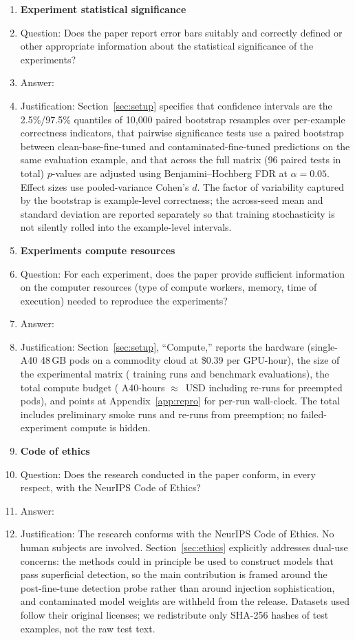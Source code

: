 \begin{enumerate}
\item {\bf Experiment statistical significance}
    \item[] Question: Does the paper report error bars suitably and correctly defined or other appropriate information about the statistical significance of the experiments?
    \item[] Answer: \answerYes{}
    \item[] Justification: Section~\ref{sec:setup} specifies that confidence intervals are the 2.5\%/97.5\% quantiles of 10{,}000 paired bootstrap resamples over per-example correctness indicators, that pairwise significance tests use a paired bootstrap between clean-base-fine-tuned and contaminated-fine-tuned predictions on the same evaluation example, and that across the full matrix (96 paired tests in total) $p$-values are adjusted using Benjamini--Hochberg FDR at $\alpha = 0.05$. Effect sizes use pooled-variance Cohen's $d$. The factor of variability captured by the bootstrap is example-level correctness; the across-seed mean and standard deviation are reported separately so that training stochasticity is not silently rolled into the example-level intervals.

\item {\bf Experiments compute resources}
    \item[] Question: For each experiment, does the paper provide sufficient information on the computer resources (type of compute workers, memory, time of execution) needed to reproduce the experiments?
    \item[] Answer: \answerYes{}
    \item[] Justification: Section~\ref{sec:setup}, ``Compute,'' reports the hardware (single-A40 48\,GB pods on a commodity cloud at \$0.39 per GPU-hour), the size of the experimental matrix ( training runs and  benchmark evaluations), the total compute budget ( A40-hours $\approx$ \,USD including re-runs for preempted pods), and points at Appendix~\ref{app:repro} for per-run wall-clock. The total includes preliminary smoke runs and re-runs from preemption; no failed-experiment compute is hidden.

\item {\bf Code of ethics}
    \item[] Question: Does the research conducted in the paper conform, in every respect, with the NeurIPS Code of Ethics?
    \item[] Answer: \answerYes{}
    \item[] Justification: The research conforms with the NeurIPS Code of Ethics. No human subjects are involved. Section~\ref{sec:ethics} explicitly addresses dual-use concerns: the methods could in principle be used to construct models that pass superficial detection, so the main contribution is framed around the post-fine-tune detection probe rather than around injection sophistication, and contaminated model weights are withheld from the release. Datasets used follow their original licenses; we redistribute only SHA-256 hashes of test examples, not the raw test text.


\end{enumerate}
